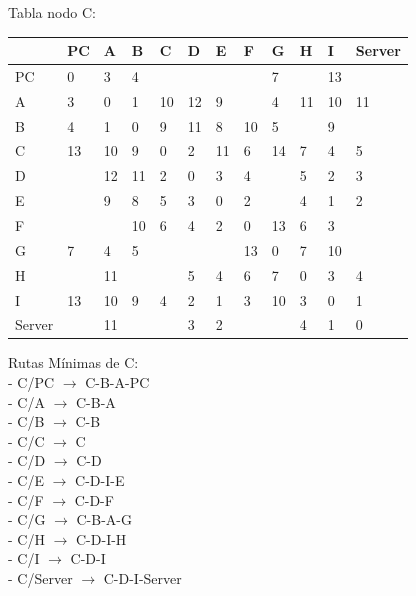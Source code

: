 \documentclass[a4paper]{article}
\begin{document}
\begin{table}[ht]
Tabla nodo C:\\
\begin{tabular}{|l|l|l|l|l|l|l|l|l|l|l|l|}
\hline
       & PC & A  & B & C & D & E & F & G & H & I  & Server \\ \hline
PC     & 0  & 3  & 4 &   &   &   &   & 7 &   & 13 &        \\ \hline
A      & 3  & 0  & 1 & 10& 12& 9 &   & 4 & 11& 10 & 11     \\ \hline
B      & 4  & 1  & 0 & 9 & 11& 8 & 10& 5 &   & 9  &        \\ \hline
C      & 13 & 10 & 9 & 0 & 2 & 11& 6 & 14& 7 & 4  & 5      \\ \hline
D      &    & 12 & 11& 2 & 0 & 3 & 4 &   & 5 & 2  & 3      \\ \hline
E      &    & 9  & 8 & 5 & 3 & 0 & 2 &   & 4 & 1  & 2      \\ \hline
F      &    &    & 10& 6 & 4 & 2 & 0 & 13& 6 & 3  &        \\ \hline
G      & 7  & 4  & 5 &   &   &   & 13& 0 & 7 & 10 &        \\ \hline
H      &    & 11 &   &   & 5 & 4 & 6 & 7 & 0 & 3  & 4      \\ \hline
I      & 13 & 10 & 9 & 4 & 2 & 1 & 3 & 10& 3 & 0  & 1      \\ \hline
Server &    & 11 &   &   & 3 & 2 &   &   & 4 & 1  & 0      \\ \hline
\end{tabular}

Rutas Mínimas de C:\\
-	C/PC  $\rightarrow$  C-B-A-PC\\
-	C/A  $\rightarrow$ C-B-A\\
-	C/B  $\rightarrow$  C-B\\
-	C/C  $\rightarrow$  C\\
-	C/D  $\rightarrow$  C-D\\
-	C/E  $\rightarrow$  C-D-I-E\\
-	C/F  $\rightarrow$  C-D-F\\
-	C/G  $\rightarrow$  C-B-A-G\\
-	C/H  $\rightarrow$  C-D-I-H\\
-	C/I  $\rightarrow$  C-D-I\\
-	C/Server  $\rightarrow$  C-D-I-Server\\
\end{table}

\clearpage
\end{document}

